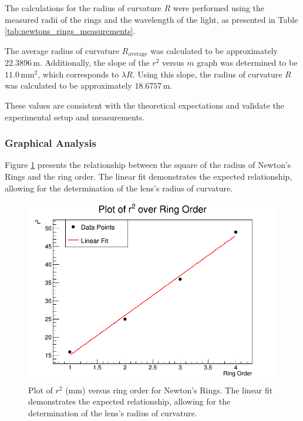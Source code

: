 \documentclass[journal]{IEEEtran}
\begin{document}
The calculations for the radius of curvature $R$ were performed using the measured radii of the rings and the wavelength of the light, as presented in Table \ref{tab:newtons_rings_measurements}.

The average radius of curvature $R_{\text{average}}$ was calculated to be approximately $22.3896 \, \text{m}$.
Additionally, the slope of the $r^2$ versus $m$ graph was determined to be $11.0 \, \text{mm}^2$, which corresponds to $\lambda R$. Using this slope, the radius of curvature $R$ was calculated to be approximately $18.6757 \, \text{m}$.

These values are consistent with the theoretical expectations and validate the experimental setup and measurements.

\subsubsection{Graphical Analysis}
Figure \ref{fig:r_squared_vs_order} presents the relationship between the square of the radius of Newton's Rings and the ring order. The linear fit demonstrates the expected relationship, allowing for the determination of the lens's radius of curvature.

\begin{figure}[H]
    \centering
    \includegraphics[width=\linewidth]{../plots/r_squared_vs_order.png}
    \caption{Plot of $r^2$ (mm) versus ring order for Newton's Rings. The linear fit demonstrates the expected relationship, allowing for the determination of the lens's radius of curvature.}
    \label{fig:r_squared_vs_order}
\end{figure}
\end{document}
